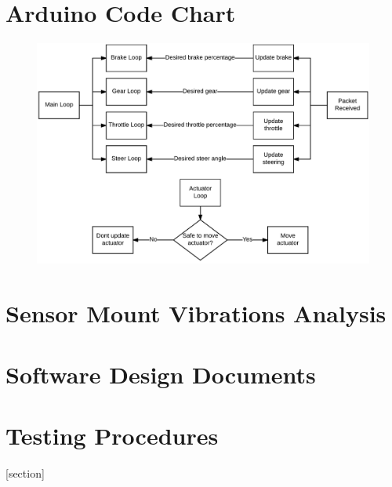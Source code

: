 \documentclass[main.tex]{subfiles}
\begin{document}
\begin{appendices}
\chapter{Arduino Code Chart}
\begin{figure}[ht]
\centering
\includegraphics[]{8-Appendices/arduinoDiagram.png}
\end{figure}

\chapter{Sensor Mount Vibrations Analysis}

\chapter{Software Design Documents}


\chapter{Testing Procedures}
[section]
\renewcommand*{\theqb}{%
  \ifnum\value{qb}<1 0 \fi%
  \arabic{qb}%
}
\newenvironment{qb}[1][]{\refstepcounter{qb}\par\medskip\indent{}
   \textbf{TC 1.\theqb:#1} \rmfamily}{\bigskip}


\end{appendices}
\end{document}
